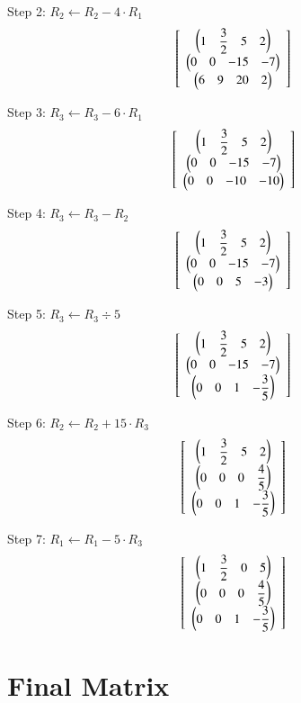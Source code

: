 \documentclass[journal]{IEEEtran}
\begin{document}
Step 2: \( R_2 \leftarrow R_2 - 4 \cdot R_1 \)
\[
\left[
\begin{array}{c}
\begin{pmatrix}1 & \dfrac{3}{2} & 5 & 2\end{pmatrix} \\
\begin{pmatrix}0 & 0 & -15 & -7\end{pmatrix} \\
\begin{pmatrix}6 & 9 & 20 & 2\end{pmatrix}
\end{array}
\right]
\]

Step 3: \( R_3 \leftarrow R_3 - 6 \cdot R_1 \)
\[
\left[
\begin{array}{c}
\begin{pmatrix}1 & \dfrac{3}{2} & 5 & 2\end{pmatrix} \\
\begin{pmatrix}0 & 0 & -15 & -7\end{pmatrix} \\
\begin{pmatrix}0 & 0 & -10 & -10\end{pmatrix}
\end{array}
\right]
\]

Step 4: \( R_3 \leftarrow R_3 - R_2 \)
\[
\left[
\begin{array}{c}
\begin{pmatrix}1 & \dfrac{3}{2} & 5 & 2\end{pmatrix} \\
\begin{pmatrix}0 & 0 & -15 & -7\end{pmatrix} \\
\begin{pmatrix}0 & 0 & 5 & -3\end{pmatrix}
\end{array}
\right]
\]

Step 5: \( R_3 \leftarrow R_3 \div 5 \)
\[
\left[
\begin{array}{c}
\begin{pmatrix}1 & \dfrac{3}{2} & 5 & 2\end{pmatrix} \\
\begin{pmatrix}0 & 0 & -15 & -7\end{pmatrix} \\
\begin{pmatrix}0 & 0 & 1 & -\dfrac{3}{5}\end{pmatrix}
\end{array}
\right]
\]

Step 6: \( R_2 \leftarrow R_2 + 15 \cdot R_3 \)
\[
\left[
\begin{array}{c}
\begin{pmatrix}1 & \dfrac{3}{2} & 5 & 2\end{pmatrix} \\
\begin{pmatrix}0 & 0 & 0 & \dfrac{4}{5}\end{pmatrix} \\
\begin{pmatrix}0 & 0 & 1 & -\dfrac{3}{5}\end{pmatrix}
\end{array}
\right]
\]

Step 7: \( R_1 \leftarrow R_1 - 5 \cdot R_3 \)
\[
\left[
\begin{array}{c}
\begin{pmatrix}1 & \dfrac{3}{2} & 0 & 5\end{pmatrix} \\
\begin{pmatrix}0 & 0 & 0 & \dfrac{4}{5}\end{pmatrix} \\
\begin{pmatrix}0 & 0 & 1 & -\dfrac{3}{5}\end{pmatrix}
\end{array}
\right]
\]

\vspace{0.4cm}

\section*{Final Matrix}
\end{document}
